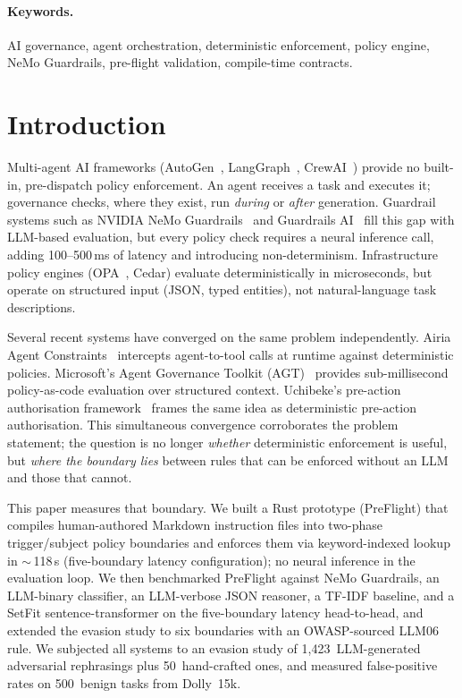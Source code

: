 \documentclass[11pt,a4paper]{article}
\begin{document}
\paragraph{Keywords.} AI governance, agent orchestration, deterministic
enforcement, policy engine, NeMo Guardrails, pre-flight validation,
compile-time contracts.

\section{Introduction}
\label{sec:intro}

Multi-agent AI frameworks (AutoGen~\cite{autogen2023},
LangGraph~\cite{langgraph2024}, CrewAI~\cite{crewai2024}) provide no
built-in, pre-dispatch policy enforcement. An agent receives a task
and executes it; governance checks, where they exist, run
\emph{during} or \emph{after} generation. Guardrail systems such as
NVIDIA NeMo Guardrails~\cite{nemo2023} and Guardrails
AI~\cite{guardrailsai2023} fill this gap with LLM-based evaluation,
but every policy check requires a neural inference call, adding
100--500\,ms of latency and introducing non-determinism.
Infrastructure policy engines (OPA~\cite{opa2018}, Cedar) evaluate
deterministically in microseconds, but operate on structured input
(JSON, typed entities), not natural-language task descriptions.

Several recent systems have converged on the same problem
independently. Airia Agent Constraints~\cite{airia2025} intercepts
agent-to-tool calls at runtime against deterministic policies.
Microsoft's Agent Governance Toolkit (AGT)~\cite{agt2026} provides
sub-millisecond policy-as-code evaluation over structured context.
Uchibeke's pre-action authorisation framework~\cite{oap2026} frames
the same idea as deterministic pre-action authorisation. This
simultaneous convergence corroborates the problem statement; the
question is no longer \emph{whether} deterministic enforcement is
useful, but \emph{where the boundary lies} between rules that can be
enforced without an LLM and those that cannot.

This paper measures that boundary. We built a Rust prototype
(PreFlight) that compiles human-authored Markdown instruction files
into two-phase trigger/subject policy boundaries and enforces them
via keyword-indexed lookup in $\sim$\,118\,\textmu s (five-boundary
latency configuration); no neural
inference in the evaluation loop. We then benchmarked PreFlight
against NeMo Guardrails, an LLM-binary classifier, an LLM-verbose
JSON reasoner, a TF-IDF baseline, and a SetFit sentence-transformer
on the five-boundary latency head-to-head, and extended the evasion
study to six boundaries with an OWASP-sourced LLM06 rule. We subjected all systems to an evasion study of
1{,}423~LLM-generated adversarial rephrasings plus 50~hand-crafted
ones, and measured false-positive rates on 500~benign tasks from
Dolly~15k.
\end{document}
